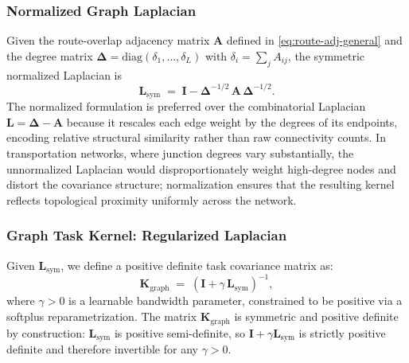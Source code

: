\documentclass[11pt]{article}
\begin{document}
\subsubsection{Normalized Graph Laplacian}
\label{subsec:normalized-laplacian}
Given the route-overlap adjacency matrix $\mathbf{A}$ defined in
\eqref{eq:route-adj-general} and the degree matrix
$\boldsymbol{\Delta} = \mathrm{diag}(\delta_1, \dots, \delta_L)$ with
$\delta_i = \sum_j A_{ij}$, the symmetric normalized Laplacian
\parencite{chung1997} is
\begin{equation}
    \mathbf{L}_{\mathrm{sym}}
    \;=\;
    \mathbf{I} - \boldsymbol{\Delta}^{-1/2}\, \mathbf{A}\, \boldsymbol{\Delta}^{-1/2}.
    \label{eq:laplacian-sym}
\end{equation}
The normalized formulation is preferred over the combinatorial Laplacian
$\mathbf{L} = \boldsymbol{\Delta} - \mathbf{A}$ \parencite{smola2003kernels}
because it rescales each edge weight by the degrees of its endpoints,
encoding relative structural similarity rather than raw connectivity counts.
In transportation networks, where junction degrees vary substantially,
the unnormalized Laplacian would disproportionately weight high-degree
nodes and distort the covariance structure; normalization ensures that
the resulting kernel reflects topological proximity uniformly across
the network.


\subsubsection{Graph Task Kernel: Regularized Laplacian}
\label{subsec:graph-kernel}

Given $\mathbf{L}_{\mathrm{sym}}$, we define a positive definite task
covariance matrix as:
\begin{equation}
    \mathbf{K}_{\mathrm{graph}}
    \;=\;
    \left( \mathbf{I} + \gamma\, \mathbf{L}_{\mathrm{sym}} \right)^{-1},
    \label{eq:graph-kernel}
\end{equation}
where $\gamma > 0$ is a learnable bandwidth parameter, constrained to be
positive via a softplus reparametrization. The matrix
$\mathbf{K}_{\mathrm{graph}}$ is symmetric and positive definite by
construction: $\mathbf{L}_{\mathrm{sym}}$ is positive semi-definite, so
$\mathbf{I} + \gamma\mathbf{L}_{\mathrm{sym}}$ is strictly positive definite
and therefore invertible for any $\gamma > 0$.
\end{document}
